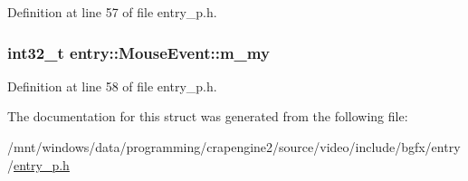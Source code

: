 Definition at line 57 of file entry\+\_\+p.\+h.

\hypertarget{structentry_1_1_mouse_event_a983a69157c19a7ed62cac2456c0c26e2}{
\subsubsection[{m\+\_\+my}]{\setlength{\rightskip}{0pt plus 5cm}int32\+\_\+t entry\+::\+Mouse\+Event\+::m\+\_\+my}}\label{structentry_1_1_mouse_event_a983a69157c19a7ed62cac2456c0c26e2}


Definition at line 58 of file entry\+\_\+p.\+h.



The documentation for this struct was generated from the following file\+:\begin{DoxyCompactItemize}
\item 
/mnt/windows/data/programming/crapengine2/source/video/include/bgfx/entry/\hyperlink{entry__p_8h}{entry\+\_\+p.\+h}\end{DoxyCompactItemize}
